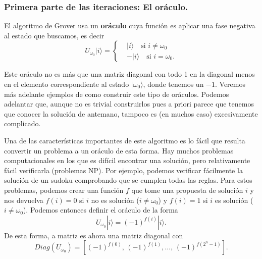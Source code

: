 \documentclass[a4paper,11pt]{article} %
\numberwithin{equation}{section}
\def\lc{\left[}
\def\rc{\right]}
\def\lch{\left\{}
\begin{document}
\subsubsection{Primera parte de las iteraciones: El oráculo.}

El algoritmo de Grover usa un \textbf{oráculo} cuya función es aplicar una fase negativa al estado que buscamos, es decir
\begin{equation} \label{ec_geo_Uw}
\boxed{U_{\omega_0} | i \rangle = 
	\lch
		\begin{matrix}
			& | i \rangle \quad \text{si } i \neq \omega_0 \\
			& - | i \rangle \quad \text{si } i = \omega_0.
		\end{matrix}
	\right.}
\end{equation}

Este oráculo no es más que una matriz diagonal con todo 1 en la diagonal menos en el elemento correspondiente al estado $| \omega_0 \rangle$, donde tenemos un $-1$. Veremos más adelante ejemplos de como construir este tipo de oráculos. Podemos adelantar que, aunque no es trivial construirlos pues a priori parece que tenemos que conocer la solución de antemano, tampoco es (en muchos caso) excesivamente complicado. 

Una de las características importantes de este algoritmo es lo fácil que resulta convertir un problema a un oráculo de esta forma. Hay muchos problemas computacionales en los que es difícil encontrar una solución, pero relativamente fácil verificarla (problemas NP). Por ejemplo, podemos verificar fácilmente la solución de un sudoku comprobando que se cumplen todas las reglas. Para estos problemas, podemos crear una función $f$ que tome una propuesta de solución $i$ y nos devuelva $f(i)=0$ si $i$ no es solución ($i \neq  \omega_0$) y $f(i) = 1$ si $i$ es solución ($i \neq  \omega_0$). Podemos entonces definir el oráculo de la forma
\begin{equation} \label{ec_geo_U_f}
\boxed{U_{\omega_0} |i \rangle = (-1)^{f(i)} |i \rangle}.
\end{equation}
De esta forma, a matriz es ahora una matriz diagonal con 
\begin{equation}
Diag(U_{\omega_0})=\lc (-1)^{f(0)}, \, (-1)^{f(1)}, \dots , \, (-1)^{f(2^n-1)}    \rc .
\end{equation}
\end{document}
